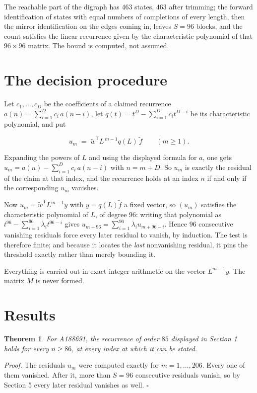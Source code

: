 \documentclass[11pt]{article}
\newtheorem{theorem}{Theorem}
\theoremstyle{definition}
\begin{document}
The reachable part of the digraph has $463$ states, $463$ after trimming; the forward identification of states with equal numbers of completions of every length, then the mirror identification on the edges coming in, leaves $S = 96$ blocks, and the count satisfies the linear recurrence given by the characteristic polynomial of that $96\times96$ matrix. The bound is computed, not assumed.

\section{The decision procedure}

Let $c_1,\dots,c_D$ be the coefficients of a claimed recurrence $a(n) = \sum_{i=1}^{D} c_i\,a(n-i)$, let $q(t) = t^{D} - \sum_{i=1}^{D} c_i t^{D-i}$ be its characteristic polynomial, and put

\[u_m \;=\; \tilde w^{\mathsf T} L^{\,m-1} q(L)\,\tilde f \qquad (m \ge 1).\]

Expanding the powers of $L$ and using the displayed formula for $a$, one gets $u_m = a(n) - \sum_{i=1}^{D} c_i\,a(n-i)$ with $n = m + D$. So $u_m$ is exactly the residual of the claim at that index, and the recurrence holds at an index $n$ if and only if the corresponding $u_m$ vanishes.

Now $u_m = \tilde w^{\mathsf T} L^{m-1} y$ with $y = q(L)\tilde f$ a fixed vector, so $(u_m)$ satisfies the characteristic polynomial of $L$, of degree $96$: writing that polynomial as $t^{96} - \sum_{i=1}^{96} \lambda_i t^{96-i}$ gives $u_{m+96} = \sum_{i=1}^{96} \lambda_i u_{m+96-i}$. Hence $96$ consecutive vanishing residuals force every later residual to vanish, by induction. The test is therefore finite; and because it locates the {\itshape last} nonvanishing residual, it pins the threshold exactly rather than merely bounding it.

Everything is carried out in exact integer arithmetic on the vector $L^{m-1}y$. The matrix $M$ is never formed.

\section{Results}

\begin{theorem} For A188691, the recurrence of order $85$ displayed in Section 1 holds for every $n \ge 86$, at every index at which it can be stated.\end{theorem}

{\itshape Proof.} The residuals $u_m$ were computed exactly for $m = 1,\dots,206$. Every one of them vanished. After it, more than $S = 96$ consecutive residuals vanish, so by Section 5 every later residual vanishes as well. $\square$
\end{document}
